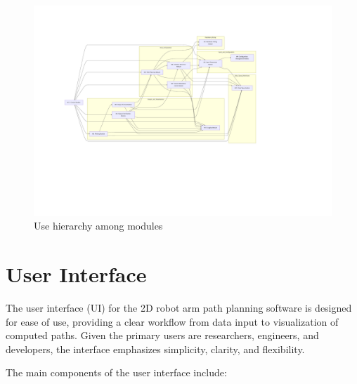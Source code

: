 \documentclass[12pt, titlepage]{article}
\begin{document}
\begin{figure}[H]
\centering
\includegraphics[width=1\textwidth]{figure2.pdf}
\caption{Use hierarchy among modules}
\label{FigUH}
\end{figure}




\section{User Interface} \label{SecUI}

The user interface (UI) for the 2D robot arm path planning software is designed for ease of use, providing a clear workflow from data input to visualization of computed paths. Given the primary users are researchers, engineers, and developers, the interface emphasizes simplicity, clarity, and flexibility.

The main components of the user interface include:
\end{document}
